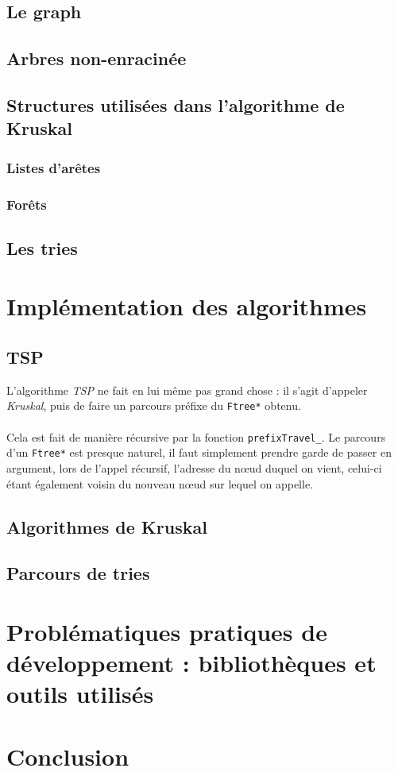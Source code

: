 \documentclass[a4paper]{article}
\begin{document}
\subsection{Le graph}

\subsection{Arbres non-enracinée}

\subsection{Structures utilisées dans l'algorithme de Kruskal}

\subsubsection{Listes d'arêtes}

\subsubsection{Forêts}

\subsection{Les tries}

\section{Implémentation des algorithmes}

\subsection{TSP}
L'algorithme \emph{TSP} ne fait en lui même pas grand chose : il s'agit d'appeler \emph{Kruskal}, puis de faire un parcours préfixe du \texttt{Ftree*} obtenu.

\paragraph*{}
Cela est fait de manière récursive par la fonction \texttt{prefixTravel_}. Le parcours d'un \texttt{Ftree*} est presque naturel, il faut simplement prendre garde de passer en argument, lors de l'appel récursif, l'adresse du nœud duquel on vient, celui-ci étant également voisin du nouveau nœud sur lequel on appelle.
\subsection{Algorithmes de Kruskal}

\subsection{Parcours de tries}

\section{Problématiques pratiques de développement : bibliothèques et outils utilisés}


\section*{Conclusion}
\end{document}
